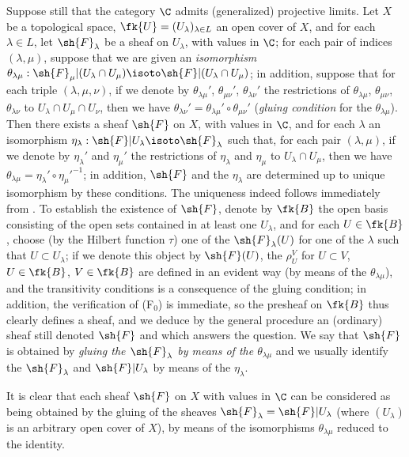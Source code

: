 \begin{env}[3.3.1]
\label{0.3.3.1}
Suppose still that the category $\C$ admits (generalized) projective limits. Let
$X$ be a topological space, $\fk{U}=(U_\lambda)_{\lambda\in L}$ an open
cover of $X$, and for each $\lambda\in L$, let $\sh{F}_\lambda$ be a sheaf on
$U_\lambda$, with values in $\C$; for each pair of indices $(\lambda,\mu)$,
suppose that we are given an \emph{isomorphism}
$\theta_{\lambda\mu}:\sh{F}_\mu|(U_\lambda\cap U_\mu)
  \isoto\sh{F}|(U_\lambda\cap U_\mu)$; in addition, suppose that for each triple
$(\lambda,\mu,\nu)$, if we denote by $\theta_{\lambda\mu}'$, $\theta_{\mu\nu}'$,
$\theta_{\lambda\nu}'$ the restrictions of $\theta_{\lambda\mu}$,
$\theta_{\mu\nu}$, $\theta_{\lambda\nu}$ to $U_\lambda\cap U_\mu\cap U_\nu$,
then we have $\theta_{\lambda\nu}'=\theta_{\lambda\mu}'\circ\theta_{\mu\nu}'$
(\emph{gluing condition} for the $\theta_{\lambda\mu}$). Then there exists a
sheaf $\sh{F}$ on $X$, with values in $\C$, and for each $\lambda$ an
isomorphism $\eta_\lambda:\sh{F}|U_\lambda\isoto\sh{F}_\lambda$ such that, for
each pair $(\lambda,\mu)$, if we denote by $\eta_\lambda'$ and $\eta_\mu'$ the
restrictions of $\eta_\lambda$ and $\eta_\mu$ to $U_\lambda\cap U_\mu$, then we
have $\theta_{\lambda\mu}=\eta_\lambda'\circ{\eta_\mu'}^{-1}$; in addition,
$\sh{F}$ and the $\eta_\lambda$ are determined up to unique isomorphism by these
conditions. The uniqueness indeed follows immediately from .
To establish the existence of $\sh{F}$, denote by $\fk{B}$ the open basis
consisting of the open sets contained in at least one $U_\lambda$, and for each
$U\in\fk{B}$, choose (by the Hilbert function $\tau$) one of the
$\sh{F}_\lambda(U)$ for one of the $\lambda$ such that $U\subset U_\lambda$; if
we denote this object by $\sh{F}(U)$, the $\rho_U^V$ for $U\subset V$,
$U\in\fk{B}$, $V\in\fk{B}$ are defined in an evident way (by means
of the $\theta_{\lambda\mu}$), and the transitivity conditions is a consequence
of the gluing condition; in addition, the verification of (F$_0$) is immediate,
so the presheaf on $\fk{B}$ thus clearly defines a sheaf, and we deduce by
the general procedure  an (ordinary) sheaf still denoted
$\sh{F}$ and which answers the question. We say that $\sh{F}$ is obtained by
\emph{gluing the $\sh{F}_\lambda$ by means of the $\theta_{\lambda\mu}$} and we
usually identify the $\sh{F}_\lambda$ and $\sh{F}|U_\lambda$ by means of the
$\eta_\lambda$.

It is clear that each sheaf $\sh{F}$ on $X$ with values in $\C$ can be
considered as being obtained by the gluing of the sheaves
$\sh{F}_\lambda=\sh{F}|U_\lambda$ (where $(U_\lambda)$ is an arbitrary open
cover of $X$), by means of the isomorphisms $\theta_{\lambda\mu}$ reduced to the
identity.
\end{env}

